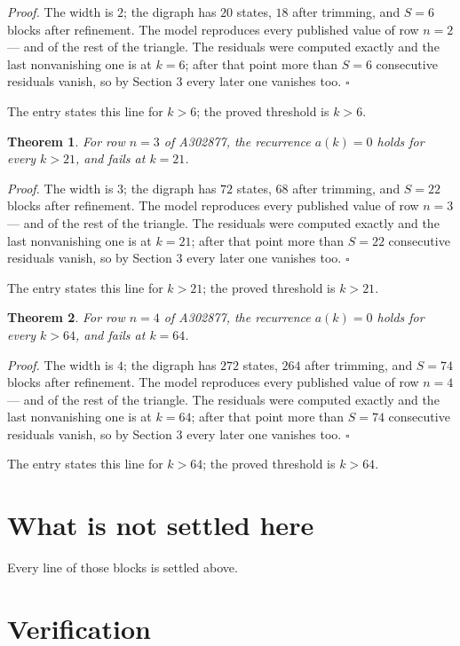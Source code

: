 \documentclass[11pt]{article}
\newtheorem{theorem}{Theorem}
\theoremstyle{definition}
\begin{document}
{\itshape Proof.} The width is $2$; the digraph has $20$ states, $18$ after trimming, and $S = 6$ blocks after refinement. The model reproduces every published value of row $n = 2$ --- and of the rest of the triangle. The residuals were computed exactly and the last nonvanishing one is at $k = 6$; after that point more than $S = 6$ consecutive residuals vanish, so by Section 3 every later one vanishes too. $\square$

The entry states this line for $k > 6$; the proved threshold is $k > 6$.

\begin{theorem} For row $n = 3$ of A302877, the recurrence $a(k) = 0$ holds for every $k > 21$, and fails at $k = 21$.\end{theorem}

{\itshape Proof.} The width is $3$; the digraph has $72$ states, $68$ after trimming, and $S = 22$ blocks after refinement. The model reproduces every published value of row $n = 3$ --- and of the rest of the triangle. The residuals were computed exactly and the last nonvanishing one is at $k = 21$; after that point more than $S = 22$ consecutive residuals vanish, so by Section 3 every later one vanishes too. $\square$

The entry states this line for $k > 21$; the proved threshold is $k > 21$.

\begin{theorem} For row $n = 4$ of A302877, the recurrence $a(k) = 0$ holds for every $k > 64$, and fails at $k = 64$.\end{theorem}

{\itshape Proof.} The width is $4$; the digraph has $272$ states, $264$ after trimming, and $S = 74$ blocks after refinement. The model reproduces every published value of row $n = 4$ --- and of the rest of the triangle. The residuals were computed exactly and the last nonvanishing one is at $k = 64$; after that point more than $S = 74$ consecutive residuals vanish, so by Section 3 every later one vanishes too. $\square$

The entry states this line for $k > 64$; the proved threshold is $k > 64$.

\section{What is not settled here}

Every line of those blocks is settled above.

\section{Verification}
\end{document}

